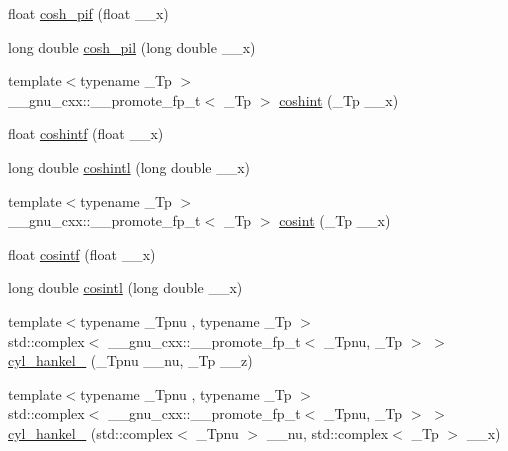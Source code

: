 \begin{DoxyCompactItemize}
\item 
float \hyperlink{group__gnu__math__spec__func_ga79a2f5c9da96b5ea6c663d6efca24944}{cosh\+\_\+pif} (float \+\_\+\+\_\+x)
\item 
long double \hyperlink{group__gnu__math__spec__func_gab7bf4f591dd35af2bdb88a8219f5e248}{cosh\+\_\+pil} (long double \+\_\+\+\_\+x)
\item 
{\footnotesize template$<$typename \+\_\+\+Tp $>$ }\\\+\_\+\+\_\+gnu\+\_\+cxx\+::\+\_\+\+\_\+promote\+\_\+fp\+\_\+t$<$ \+\_\+\+Tp $>$ \hyperlink{group__gnu__math__spec__func_ga901c23871fded7d4467a864fe06bbf07}{coshint} (\+\_\+\+Tp \+\_\+\+\_\+x)
\item 
float \hyperlink{group__gnu__math__spec__func_ga1af4d48209169967a836bd97e625a128}{coshintf} (float \+\_\+\+\_\+x)
\item 
long double \hyperlink{group__gnu__math__spec__func_ga6d24ab53fad13d421f07d9a9a509de14}{coshintl} (long double \+\_\+\+\_\+x)
\item 
{\footnotesize template$<$typename \+\_\+\+Tp $>$ }\\\+\_\+\+\_\+gnu\+\_\+cxx\+::\+\_\+\+\_\+promote\+\_\+fp\+\_\+t$<$ \+\_\+\+Tp $>$ \hyperlink{group__gnu__math__spec__func_ga06eed76a045a73ad72fcf4ad00b05f96}{cosint} (\+\_\+\+Tp \+\_\+\+\_\+x)
\item 
float \hyperlink{group__gnu__math__spec__func_ga87202351dc97d2c69e42bf58f911fb5a}{cosintf} (float \+\_\+\+\_\+x)
\item 
long double \hyperlink{group__gnu__math__spec__func_ga5f01f17ae8859129860118b09d51791c}{cosintl} (long double \+\_\+\+\_\+x)
\item 
{\footnotesize template$<$typename \+\_\+\+Tpnu , typename \+\_\+\+Tp $>$ }\\std\+::complex$<$ \+\_\+\+\_\+gnu\+\_\+cxx\+::\+\_\+\+\_\+promote\+\_\+fp\+\_\+t$<$ \+\_\+\+Tpnu, \+\_\+\+Tp $>$ $>$ \hyperlink{group__gnu__math__spec__func_gafa5ad1cfd4cc30caaeb06bdab71e600b}{cyl\+\_\+hankel\+\_} (\+\_\+\+Tpnu \+\_\+\+\_\+nu, \+\_\+\+Tp \+\_\+\+\_\+z)
\item 
{\footnotesize template$<$typename \+\_\+\+Tpnu , typename \+\_\+\+Tp $>$ }\\std\+::complex$<$ \+\_\+\+\_\+gnu\+\_\+cxx\+::\+\_\+\+\_\+promote\+\_\+fp\+\_\+t$<$ \+\_\+\+Tpnu, \+\_\+\+Tp $>$ $>$ \hyperlink{group__gnu__math__spec__func_ga0f0b05c483ed1d713ef9a96e844c1979}{cyl\+\_\+hankel\+\_} (std\+::complex$<$ \+\_\+\+Tpnu $>$ \+\_\+\+\_\+nu, std\+::complex$<$ \+\_\+\+Tp $>$ \+\_\+\+\_\+x)
\item 

\end{DoxyCompactItemize}
